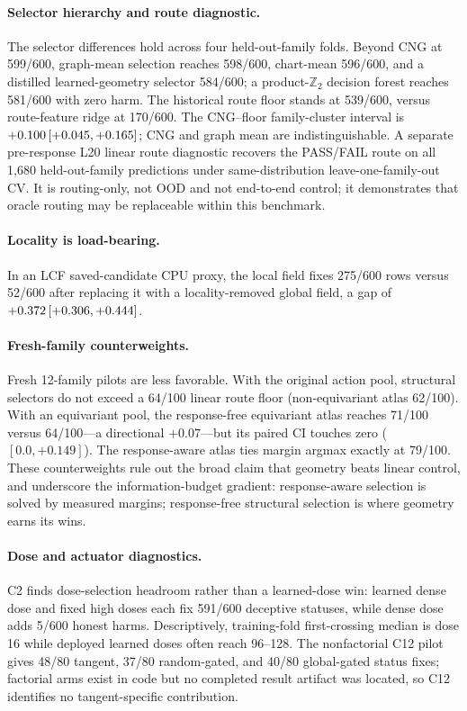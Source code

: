 \paragraph{Selector hierarchy and route diagnostic.}
The selector differences hold across four held-out-family folds. Beyond CNG at
599/600, graph-mean selection reaches 598/600, chart-mean 596/600, and a distilled
learned-geometry selector 584/600; a product-$\mathbb{Z}_2$ decision forest reaches 581/600
with zero harm. The historical route floor stands at 539/600, versus route-feature ridge at
170/600. The CNG--floor family-cluster interval is $+0.100\,[+0.045,+0.165]$; CNG and
graph mean are indistinguishable. A separate pre-response L20 linear route diagnostic
recovers the PASS/FAIL route on all 1,680 held-out-family predictions under same-distribution
leave-one-family-out CV. It is routing-only, not OOD and not end-to-end control; it
demonstrates that oracle routing may be replaceable within this benchmark.

\paragraph{Locality is load-bearing.}
In an LCF saved-candidate CPU proxy, the local field fixes 275/600 rows versus 52/600 after
replacing it with a locality-removed global field, a gap of $+0.372\,[+0.306,+0.444]$.

\paragraph{Fresh-family counterweights.}
Fresh 12-family pilots are less favorable. With the original action pool, structural selectors
do not exceed a 64/100 linear route floor (non-equivariant atlas 62/100). With an
equivariant pool, the response-free equivariant atlas reaches 71/100 versus 64/100---a
directional $+0.07$---but its paired CI touches zero ($[0.0,+0.149]$). The response-aware
atlas ties margin argmax exactly at 79/100. These counterweights rule out the broad claim
that geometry beats linear control, and underscore the information-budget gradient:
response-aware selection is solved by measured margins; response-free structural selection
is where geometry earns its wins.

\paragraph{Dose and actuator diagnostics.}
C2 finds dose-selection headroom rather than a learned-dose win: learned dense dose and
fixed high doses each fix 591/600 deceptive statuses, while dense dose adds 5/600 honest
harms. Descriptively, training-fold first-crossing median is dose 16 while deployed learned
doses often reach 96--128. The nonfactorial C12 pilot gives 48/80 tangent, 37/80
random-gated, and 40/80 global-gated status fixes; factorial arms exist in code but no
completed result artifact was located, so C12 identifies no tangent-specific contribution.


